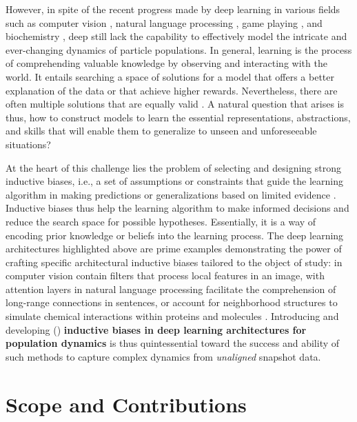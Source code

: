 However, in spite of the recent progress made by deep learning in various fields such as computer vision \citep{lecun1998gradient, krizhevsky2012imagenet}, natural language processing \citep{bengio2000neural, vaswani2017attention}, game playing \citep{mnih2015human, silver2016mastering}, and biochemistry \citep{jumper2021highly}, deep  still lack the capability to effectively model the intricate and ever-changing dynamics of particle populations. 
In general, learning is the process of comprehending valuable knowledge by observing and interacting with the world. It entails searching a space of solutions for a model that offers a better explanation of the data or that achieve higher rewards. Nevertheless, there are often multiple solutions that are equally valid \citep{goodman1965new}. A natural question that arises is thus, how to construct models to learn the essential representations, abstractions, and skills that will enable them to generalize to unseen and unforeseeable situations?

At the heart of this challenge lies the problem of selecting and designing strong inductive biases, i.e.,  a set of assumptions or constraints that guide the learning algorithm in making predictions or generalizations based on limited evidence \citep{mitchell1980need}. Inductive biases thus help the learning algorithm to make informed decisions and reduce the search space for possible hypotheses. Essentially, it is a way of encoding prior knowledge or beliefs into the learning process.
The deep learning architectures highlighted above are prime examples demonstrating the power of crafting specific architectural inductive biases tailored to the object of study:  in computer vision contain filters that process local features in an image,  with attention layers in natural language processing facilitate the comprehension of long-range connections in sentences, or  account for neighborhood structures to simulate chemical interactions within proteins and molecules \citep{ganea2022independent, somnath2021multi, kipf2016semi, jin2021iterative, battaglia2018relational}.
Introducing and developing () \textbf{inductive biases in deep learning architectures for population dynamics}  is thus quintessential toward the success and ability of such methods to capture complex dynamics from \emph{unaligned} snapshot data.

\section{Scope and Contributions}

